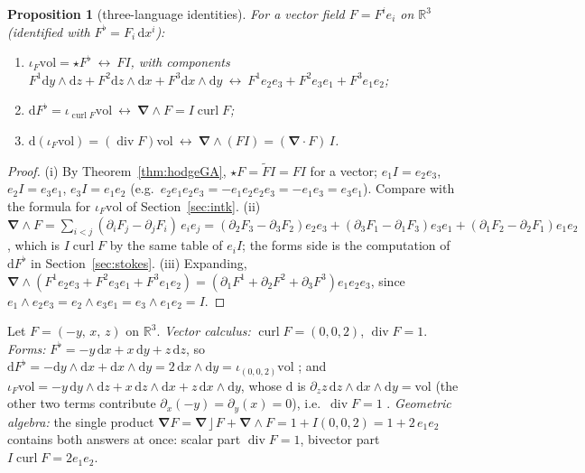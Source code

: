 \documentclass[11pt,a4paper]{article}
\newcounter{thm}[section]
\numberwithin{equation}{section}
\theoremstyle{definition}
\theoremstyle{plain}
\newtheorem{proposition}[thm]{Proposition}
\newcommand{\R}{\mathbb{R}}
\newcommand{\dd}{\mathrm{d}}
\newcommand{\vol}{\mathrm{vol}}
\newcommand{\rev}[1]{\widetilde{#1}}
\newcommand{\lc}{\mathbin{\rfloor}}
\newcommand{\pss}{I}
\newcommand{\hodge}{\star}
\newcommand{\vd}{\boldsymbol{\nabla}}               %
\begin{document}
\begin{proposition}[three-language identities]\label{prop:threelang}
For a vector field $F=F^ie_i$ on $\R^3$ (identified with $F^\flat=F_i\,\dd x^i$):
\begin{enumerate}[label=(\roman*)]
\item $\iota_F\vol=\hodge F^\flat\ \leftrightarrow\ F\pss$, with components $F^1\dd y\wedge\dd z+F^2\dd z\wedge\dd x+F^3\dd x\wedge\dd y\ \leftrightarrow\ F^1e_2e_3+F^2e_3e_1+F^3e_1e_2$;
\item $\dd F^\flat=\iota_{\operatorname{curl}F}\vol\ \leftrightarrow\ \vd\wedge F=\pss\operatorname{curl}F$;
\item $\dd(\iota_F\vol)=(\operatorname{div}F)\vol\ \leftrightarrow\ \vd\wedge(F\pss)=(\vd\cdot F)\,\pss$.
\end{enumerate}
\end{proposition}
\begin{proof}
(i) By Theorem~\ref{thm:hodgeGA}, $\hodge F=\rev F\pss=F\pss$ for a vector; $e_1\pss=e_2e_3$, $e_2\pss=e_3e_1$, $e_3\pss=e_1e_2$ (e.g.\ $e_2e_1e_2e_3=-e_1e_2e_2e_3=-e_1e_3=e_3e_1$). Compare with the formula for $\iota_F\vol$ of Section~\ref{sec:intk}. (ii) $\vd\wedge F=\sum_{i<j}(\partial_iF_j-\partial_jF_i)\,e_ie_j=(\partial_2F_3-\partial_3F_2)e_2e_3+(\partial_3F_1-\partial_1F_3)e_3e_1+(\partial_1F_2-\partial_2F_1)e_1e_2$, which is $\pss\operatorname{curl}F$ by the same table of $e_i\pss$; the forms side is the computation of $\dd F^\flat$ in Section~\ref{sec:stokes}. (iii) Expanding, $\vd\wedge(F^1e_2e_3+F^2e_3e_1+F^3e_1e_2)=(\partial_1F^1+\partial_2F^2+\partial_3F^3)e_1e_2e_3$, since $e_1\wedge e_2e_3=e_2\wedge e_3e_1=e_3\wedge e_1e_2=\pss$.
\end{proof}

\begin{example}\label{ex:threelang}
Let $F=(-y,\,x,\,z)$ on $\R^3$. \emph{Vector calculus:} $\operatorname{curl}F=(0,0,2)$, $\operatorname{div}F=1$.
\emph{Forms:} $F^\flat=-y\,\dd x+x\,\dd y+z\,\dd z$, so $\dd F^\flat=-\dd y\wedge\dd x+\dd x\wedge\dd y=2\,\dd x\wedge\dd y=\iota_{(0,0,2)}\vol$ \checkmark; and $\iota_F\vol=-y\,\dd y\wedge\dd z+x\,\dd z\wedge\dd x+z\,\dd x\wedge\dd y$, whose $\dd$ is $\partial_zz\,\dd z\wedge\dd x\wedge\dd y=\vol$ (the other two terms contribute $\partial_x(-y)=\partial_y(x)=0$), i.e.\ $\operatorname{div}F=1$ \checkmark.
\emph{Geometric algebra:} the single product $\vd F=\vd\lc F+\vd\wedge F=1+\pss(0,0,2)=1+2\,e_1e_2$ contains both answers at once: scalar part $\operatorname{div}F=1$, bivector part $\pss\operatorname{curl}F=2e_1e_2$.
\end{example}
\end{document}
